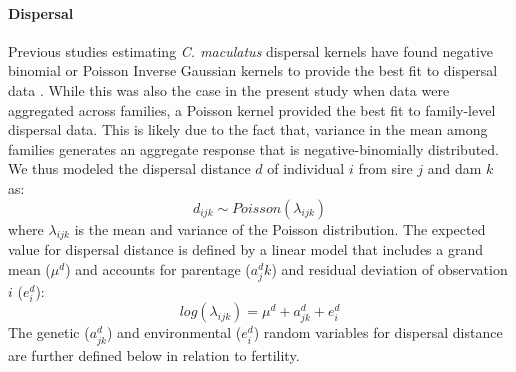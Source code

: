 \paragraph{Dispersal}
Previous studies estimating \textit{C. maculatus} dispersal kernels have found negative binomial or Poisson Inverse Gaussian kernels to provide the best fit to dispersal data \citep{miller_sex_2013,wagner_genetic_2016,ochocki_rapid_2017}. While this was also the case in the present study when data were aggregated across families, a Poisson kernel provided the best fit to family-level dispersal data. This is likely due to the fact that, variance in the mean among families generates an aggregate response that is negative-binomially distributed. We thus modeled the dispersal distance $d$ of individual $i$ from sire $j$ and dam $k$ as:
%
\begin{equation}\label{corr:dispersal_random}
  d_{ijk} \sim \mathit{Poisson}(\lambda_{ijk})
\end{equation}
%
where $\lambda_{ijk}$ is the mean and variance of the Poisson distribution. The expected value for dispersal distance is defined by a linear model that includes a grand mean ($\mu^{d}$) and accounts for parentage ($a^{d}_jk$) and residual deviation of observation $i$ ($e^{d}_i$):
%
\begin{equation} \label{corr:dispersal_linmod}
  log(\lambda_{ijk}) = \mu^{d} + a^{d}_{jk} + e^{d}_{i}
\end{equation}
%
The genetic ($a^{d}_{jk}$) and environmental ($e^{d}_i$) random variables for dispersal distance are further defined below in relation to fertility. 

